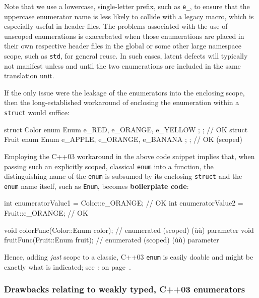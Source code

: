 \noindent Note that
we use a lowercase, single-letter prefix, such as \texttt{e\_}, to
ensure that the uppercase enumerator name is less likely to collide
  with a legacy macro, which is especially useful in header files. The problems associated with the use of unscoped enumerations is
exacerbated when those enumerations are placed in their own respective
header files in the global or some other large namespace scope, such as
\texttt{std}, for general reuse. In such cases, latent defects will
typically not manifest unless and until the two enumerations are
included in the same translation unit.

If the only issue were the leakage of the enumerators into the enclosing
scope, then the long-established workaround of enclosing the enumeration
within a \texttt{struct} would suffice:

\begin{emcppslisting}
struct Color { enum Enum { e_RED, e_ORANGE, e_YELLOW };  };   // OK
struct Fruit { enum Enum { e_APPLE, e_ORANGE, e_BANANA }; };  // OK (scoped)
\end{emcppslisting}

\noindent Employing the C++03 workaround in the above code snippet implies that,
when passing such an explicitly scoped, classical \texttt{enum} into a
function, the distinguishing name of the \texttt{enum} is subsumed by
its enclosing \texttt{struct} and the \texttt{enum} name itself, such as
\texttt{Enum}, becomes \textbf{boilerplate code}:

\begin{emcppslisting}
int enumeratorValue1 = Color::e_ORANGE;  // OK
int enumeratorValue2 = Fruit::e_ORANGE;  // OK

void colorFunc(Color::Enum color);  // enumerated (scoped) (ù{}ù) parameter
void fruitFunc(Fruit::Enum fruit);  // enumerated (scoped) (ù{}ù) parameter
\end{emcppslisting}

\noindent Hence, adding \emph{just} scope to a classic, C++03 \texttt{enum} is
easily doable and might be exactly what is indicated; see
\textit{: } on page~\pageref{strong-typing-of-an-enum-class-can-be-counterproductive}.

\subsubsection[Drawbacks relating to weakly typed, C++03 enumerators]{Drawbacks relating to weakly typed, C++03 enumerators}\label{drawbacks-relating-to-weakly-typed,-c++03-enumerators}


